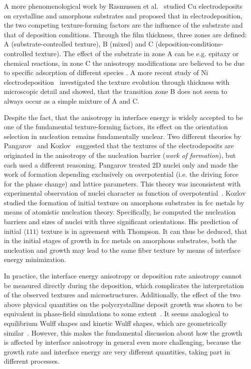 A more phenomenological work by Rasmussen et al.~\cite{Rasmussen2001} studied Cu electrodeposits on crystalline and amorphous substrates and proposed that in electrodeposition, the two competing texture-forming factors are the influence of the substrate and that of deposition conditions. Through the film thickness, three zones are defined: A (substrate-controlled texture), B (mixed) and C (deposition-conditions-controlled texture). The effect of the substrate in zone A can be e.g. epitaxy or chemical reactions, in zone C the anisotropy modifications are believed to be due to specific adsorption of different species \cite{Amblard1979,BergenstofNielsen1997}. A more recent study of Ni electrodeposition~\cite{Alimadadi2016} investigated the texture evolution through thickness with microscopic detail and showed, that the transition zone B does not seem to always occur as a simple mixture of A and C.

Despite the fact, that the anisotropy in interface energy is widely accepted to be one of the fundamental texture-forming factors, its effect on the orientation selection in nucleation remains fundamentally unclear. Two different theories by Pangarov~\cite{Pangarov1962,Pangarov1964} and Kozlov~\cite{Kozlov2003} suggested that the textures of the electrodeposits are originated in the anisotropy of the nucleation barrier (\textit{work of formation}), but each used a different reasoning. Pangarov treated 2D nuclei only and made the work of formation depending exclusively on overpotential (i.e. the driving force for the phase change) and lattice parameters. This theory was inconsistent with experimental observation of nuclei character as function of overpotential~\cite{Bulatov2014}. Kozlov studied the formation of initial texture on amorphous substrates in fcc metals by means of atomistic nucleation theory. Specifically, he computed the nucleation barriers and sizes of nuclei with three significant orientations. His prediction of initial $\langle111\rangle$ texture is in agreement with Thompson. It can thus be deduced, that in the initial stages of growth in fcc metals on amorphous substrates, both the nucleation and growth may lead to the same fiber texture by means of interface energy minimization. 

In practice, the interface energy anisotropy or deposition rate anisotropy cannot be measured directly during the deposition, which complicates the interpretation of the observed textures and microstructures. Additionally, the effect of the two above physical quantities on the polycrystalline deposit growth was shown to be equivalent in phase-field simulations to some extent~\cite{Wendler2011}. It seems analogical to equilibrium Wulff shapes and kinetic Wulff shapes, which are geometrically similar~\cite{Kobayashi2001}. However, this makes the fundamental discussion about how the growth is affected by interface anisotropy in general even more challenging, because the growth rate and interface energy are very different quantities, taking part in different processes. 

